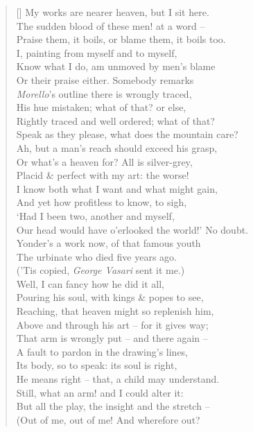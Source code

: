 \documentclass[MAIN]{subfiles}
\begin{document}
\begin{verse}[\versewidth]
My works are nearer heaven, but I sit here.\\
The sudden blood of these men! at a word --\\
Praise them, it boils, or blame them, it boils too.\\
I, painting from myself and to myself,\\
Know what I do, am unmoved by men's blame\\
Or their praise either. Somebody remarks\\
\emph{Morello}'s outline there is wrongly traced,\\ 
His hue mistaken; what of that? or else,\\
Rightly traced and well ordered; what of that?\\
Speak as they please, what does the mountain care?\\
Ah, but a man's reach should exceed his grasp,\\
Or what's a heaven for? All is silver-grey,\\
Placid \& perfect with my art: the worse!\\
I know both what I want and what might gain,\\
And yet how profitless to know, to sigh,\\
`Had I been two, another and myself,\\ 
Our head would have o'erlooked the world!' No doubt.\\
Yonder's a work now, of that famous youth\\
The urbinate who died five years ago.\\
('Tis copied, \emph{George Vasari} sent it me.)\\ 
Well, I can fancy how he did it all,\\
Pouring his soul, with kings \& popes to see,\\
Reaching, that heaven might so replenish him,\\
Above and through his art -- for it gives way;\\
That arm is wrongly put -- and there again --\\
A fault to pardon in the drawing's lines,\\
Its body, so to speak: its soul is right,\\
He means right -- that, a child may understand.\\ 
Still, what an arm! and I could alter it:\\
But all the play, the insight and the stretch --\\
(Out of me, out of me! And wherefore out?\\

\end{verse}
\end{document}
